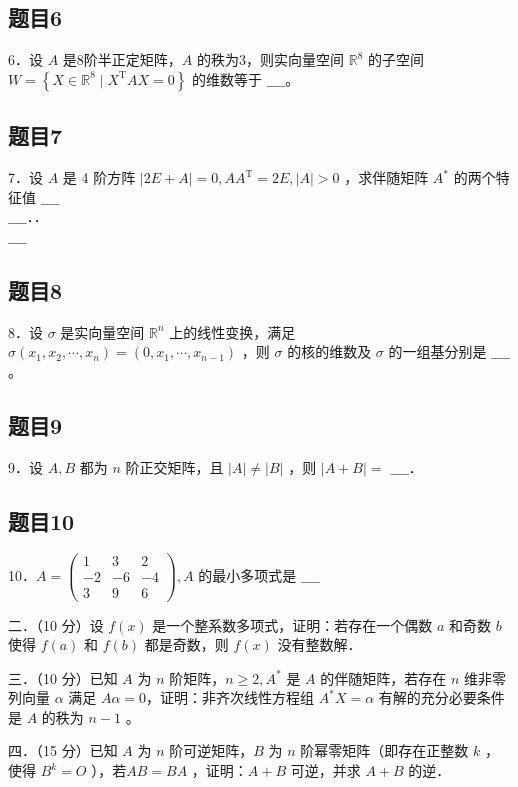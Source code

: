 \documentclass{article}
\begin{document}
\subsection{题目6}
6．设 \(A\) 是8阶半正定矩阵，\(A\) 的秩为3，则实向量空间 \(\mathbb{R}^{8}\) 的子空间 \(W=\left\{X \in \mathbb{R}^{8} \mid X^{\mathrm{T}} A X=0\right\}\) 的维数等于 \(\_\_\_\_\)。

\subsection{题目7}
7．设 \(A\) 是 4 阶方阵 \(|2 E+A|=0, A A^{\mathrm{T}}=2 E,|A|>0\) ，求伴随矩阵 \(A^{*}\) 的两个特征值 \(\_\_\_\_\)\\
\(\_\_\_\_\)．．\\
\(\_\_\_\_\)

\subsection{题目8}
8．设 \(\sigma\) 是实向量空间 \(\mathbb{R}^{n}\) 上的线性变换，满足 \(\sigma\left(x_{1}, x_{2}, \cdots, x_{n}\right)=\left(0, x_{1}, \cdots, x_{n-1}\right)\) ，则 \(\sigma\) 的核的维数及 \(\sigma\) 的一组基分别是 \(\_\_\_\_\)。

\subsection{题目9}
9．设 \(A, B\) 都为 \(n\) 阶正交矩阵，且 \(|A| \neq|B|\) ，则 \(|A+B|=\) \(\_\_\_\_\)．

\subsection{题目10}
10．\(A=\left(\begin{array}{ccc}1 & 3 & 2 \\ -2 & -6 & -4 \\ 3 & 9 & 6\end{array}\right), A\) 的最小多项式是 \(\_\_\_\_\)

二．（10 分）设 \(f(x)\) 是一个整系数多项式，证明：若存在一个偶数 \(a\) 和奇数 \(b\) 使得 \(f(a)\) 和 \(f(b)\) 都是奇数，则 \(f(x)\) 没有整数解．

三．（10 分）已知 \(A\) 为 \(n\) 阶矩阵，\(n \geq 2, A^{*}\) 是 \(A\) 的伴随矩阵，若存在 \(n\) 维非零列向量 \(\alpha\) 满足 \(A \alpha=0\)，证明：非齐次线性方程组 \(A^{*} X=\alpha\) 有解的充分必要条件是 \(A\) 的秩为 \(n-1\) 。

四．（15 分）已知 \(A\) 为 \(n\) 阶可逆矩阵，\(B\) 为 \(n\) 阶幂零矩阵（即存在正整数 \(k\) ，使得 \(B^{k}=O\) ），若\(A B=B A\) ，证明：\(A+B\) 可逆，并求 \(A+B\) 的逆．
\end{document}

